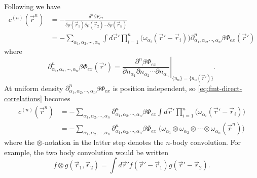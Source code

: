 \documentclass[12pt]{report}
\begin{document}
Following \cite{Rosenfeld1990} we have
\begin{equation}\label{eq:fmt-direct-correlations}
  \begin{aligned}
    c^{(n)}(\vec{r}^n) &=
    - \frac{\delta^n \beta F_{ex}}{\delta \rho(\vec{r}_1)\delta \rho(\vec{r}_2) \cdots \delta \rho(\vec{r}_n)} \\
    &=
    - \sum_{\alpha_1, \alpha_2, \cdots, \alpha_n}
    \int d\vec{r}'
    \prod_{i=1}^n \Big( \omega_{\alpha_i}(\vec{r}' - \vec{r}_i) \Big)
    \partial^n_{\alpha_1, \alpha_2, \cdots, \alpha_n} \beta\Phi_{ex}(\vec{r}')
  \end{aligned}
\end{equation}
where
\begin{equation*}
  \partial^n_{\alpha_1, \alpha_2, \cdots, \alpha_n} \beta\Phi_{ex}(\vec{r}') =
  \left.
  \frac{\partial^n \beta\Phi_{ex}}{\partial n_{\alpha_1} \partial n_{\alpha_2} \cdots \partial n_{\alpha_n}}
  \right|_{\{n_\alpha\} = \{n_\alpha(\vec{r}')\}}.
\end{equation*}
At uniform density $\partial^n_{\alpha_1, \alpha_2, \cdots, \alpha_n} \beta\Phi_{ex}$ is position independent, so \eqref{eq:fmt-direct-correlations} becomes
\begin{equation}\label{eq:fmt-direct-correlations-uniform-density}
  \begin{aligned}
    c^{(n)}(\vec{r}^n) &=
    - \sum_{\alpha_1, \alpha_2, \cdots, \alpha_n}
    \partial^n_{\alpha_1, \alpha_2, \cdots, \alpha_n} \beta\Phi_{ex}
    \int d\vec{r}'
    \prod_{i=1}^n \Big( \omega_{\alpha_i}(\vec{r}' - \vec{r}_i) \Big) \\
    &=
    - \sum_{\alpha_1, \alpha_2, \cdots, \alpha_n}
    \partial^n_{\alpha_1, \alpha_2, \cdots, \alpha_n} \beta\Phi_{ex} \;
    \Big(
    \omega_{\alpha_1} \otimes \omega_{\alpha_2} \otimes \cdots \otimes \omega_{\alpha_n}
    (\vec{r}^n)
    \Big)
  \end{aligned}
\end{equation}
where the $\otimes$-notation in the latter step denotes the $n$-body convolution.
For example, the two body convolution would be written%
\begin{equation*}
  f \otimes g(\vec{r}_1, \vec{r}_2) =
  \int d\vec{r}' f(\vec{r}' - \vec{r}_1) g(\vec{r}' - \vec{r}_2).
\end{equation*}
\end{document}
